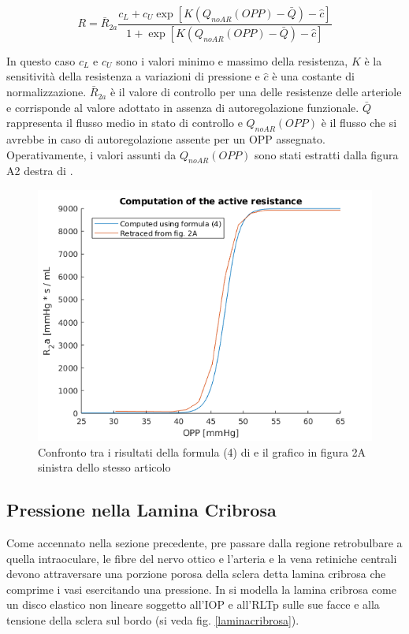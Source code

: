 \documentclass{article}
\begin{document}
\begin{equation}
R = \bar{R}_{2a} \frac{c_L + c_U \exp \left[ K \left(Q_{noAR}(OPP) - \bar{Q}\right) - \hat{c}\right]}{1 + \exp \left[ K \left(Q_{noAR}(OPP) - \bar{Q}\right) - \hat{c}\right]}
\label{activeR}
\end{equation}

In questo caso $c_L$ e $c_U$ sono i valori minimo e massimo della resistenza, $K$ è la sensitività della resistenza a variazioni di pressione e $\hat{c}$ è una costante di normalizzazione.
$\bar{R}_{2a}$ è il valore di controllo per una delle resistenze delle arteriole e corrisponde al valore adottato in assenza di autoregolazione funzionale.
$\bar{Q}$ rappresenta il flusso medio in stato di controllo e $Q_{noAR}(OPP)$ è il flusso che si avrebbe in caso di autoregolazione assente per un OPP assegnato.
Operativamente, i valori assunti da $Q_{noAR}(OPP)$ sono stati estratti dalla figura A2 destra di \cite{art1}.

\begin{figure}[h]
\begin{center}
\includegraphics[width=1.0\textwidth]{Pictures/compare_R2a.png}
\caption{Confronto tra i risultati della formula (4) di \cite{art1} e il grafico in figura 2A sinistra dello stesso articolo}
\label{compare_active}
\end{center}
\end{figure}

\subsection{Pressione nella Lamina Cribrosa}
\label{sez_lamcri}
Come accennato nella sezione precedente, pre passare dalla regione retrobulbare a quella intraoculare, le fibre del nervo ottico e l'arteria e la vena retiniche centrali devono attraversare una porzione porosa della sclera detta lamina cribrosa che comprime i vasi esercitando una pressione.
In \cite{art3} si modella la lamina cribrosa come un disco elastico non lineare soggetto all'IOP e all'RLTp sulle sue facce e alla tensione della sclera sul bordo (si veda fig. \ref{laminacribrosa}).
\end{document}
